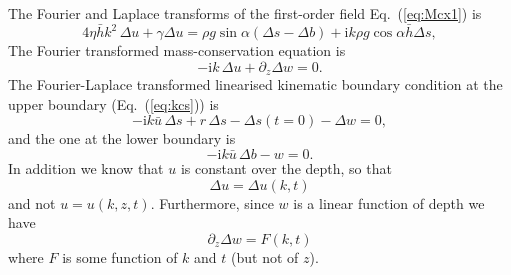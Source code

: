 \documentclass[10pt,a4paper]{book}
\newcommand{\p}{\partial}
\newcommand{\I}{\mathrm{i}}
\begin{document}
The Fourier and Laplace transforms of the first-order field
Eq.~(\ref{eq:Mcx1}) is
\begin{equation}
4 \eta \bar{h} k^2\, \Delta u + \gamma \Delta u  
= \rho g \sin \alpha (\Delta s-\Delta b)  + \I k \rho g \cos \alpha  \bar{h} \Delta s ,
\label{eq:Mcx1kl}
\end{equation}
The Fourier transformed mass-conservation equation is
\begin{equation}
-\I k \, \Delta u + \p_z  \Delta w =0.
\label{eq:Masskl}
\end{equation}
The Fourier-Laplace transformed linearised kinematic boundary
condition at the upper boundary (Eq.~(\ref{eq:kcs})) is
\begin{equation}
-\I k \bar{u} \,\Delta s +r \, \Delta s - \Delta s(t=0) -\Delta w =0,
\label{eq:flbcs}
\end{equation}
and the one at the lower boundary is
\begin{equation}
-\I k \bar{u} \,\Delta b - w =0.
\label{eq:flbcb}
\end{equation}
In addition we know that $u$ is constant over the depth, so that
\begin{equation}
\Delta u=\Delta u(k,t)
\label{eq:ukt}
\end{equation}
and not $u=u(k,z,t)$. Furthermore, since $w$ is a linear function of
depth we have
\begin{equation}
\p_z \Delta w= F(k,t)
\label{eq:wkt}
\end{equation}
where $F$ is some function of $k$ and $t$ (but not of $z$).
\end{document}
